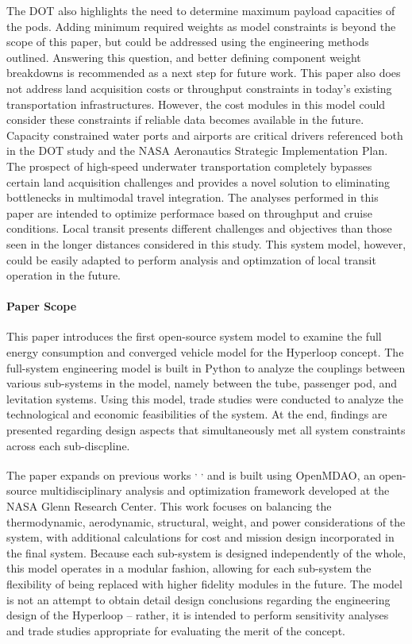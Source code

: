 	The DOT also highlights the need to determine maximum payload capacities
	of the pods. Adding minimum required weights as model constraints is beyond the scope of
	this paper, but could be addressed using the engineering methods outlined.
	Answering this question, and better defining component weight breakdowns
	is recommended as a next step for future work.
	This paper also does not address land acquisition costs or throughput
	constraints in today's existing transportation infrastructures.
	However, the cost modules in this model could consider these constraints if
	reliable data becomes available in the future.
	Capacity constrained water ports and airports are critical drivers referenced
	both in the DOT study and the NASA Aeronautics Strategic
	Implementation Plan. The prospect of high-speed underwater transportation
	completely bypasses certain land acquisition challenges and provides a novel solution
	to eliminating bottlenecks in multimodal travel integration. The analyses performed in this paper
	are intended to optimize performace based on throughput and cruise conditions.
	Local transit presents different challenges and objectives than those seen in the longer distances
	considered in this study. This system model, however, could be easily adapted to perform
	analysis and optimzation of local transit operation in the future.\\

\paragraph{Paper Scope}
	This paper introduces the first open-source system model to examine the
	full energy consumption and converged vehicle model for the Hyperloop concept.
	The full-system engineering model is built in Python to analyze the couplings
	between various sub-systems in the model, namely between the tube, passenger pod, and
	levitation systems. Using this model, trade studies were conducted to analyze the technological
	and economic feasibilities of the system.
	At the end, findings are presented regarding design aspects that simultaneously
	met all system constraints across each sub-discpline.

	The paper expands on previous works \cite{Chin} \textsuperscript{,}
	\cite{goodwin2009cantera}\textsuperscript{,} \cite{GrayBenchmarking2013}
	and is built using OpenMDAO, an open-source multidisciplinary analysis and
	optimization framework developed at the NASA Glenn Research Center.
	This work focuses on balancing the thermodynamic, aerodynamic, structural,
	weight, and power considerations of the system, with additional calculations for cost
	and mission design incorporated in the final system. Because each sub-system
	is designed independently of the whole, this model operates in a modular fashion, allowing
	for each sub-system the flexibility of being replaced with higher fidelity modules in the future.
	The model is not an attempt to obtain detail design conclusions regarding the
	engineering design of the Hyperloop -- rather, it is intended to perform
	sensitivity analyses and trade studies appropriate for evaluating the merit of the concept.

